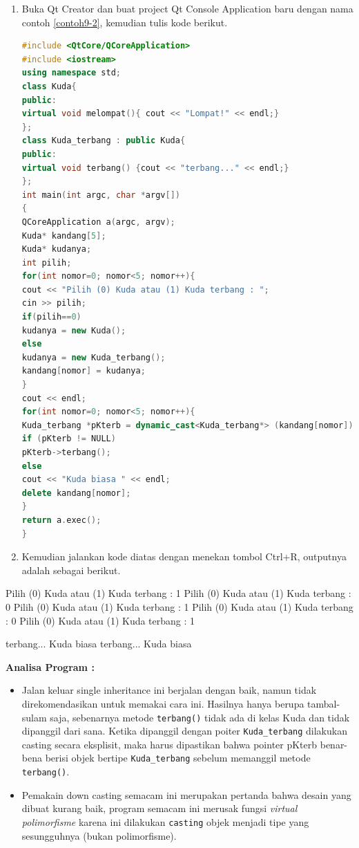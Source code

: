 \begin{enumerate}

\item
  Buka Qt Creator dan buat project Qt Console Application baru dengan
  nama contoh \ref{contoh9-2}, kemudian tulis kode berikut.

\begin{lstlisting}[language=c++, caption= Melakukan Down Casting, label=contoh9-2]
#include <QtCore/QCoreApplication>
#include <iostream>
using namespace std;
class Kuda{
public:
virtual void melompat(){ cout << "Lompat!" << endl;}
};
class Kuda_terbang : public Kuda{
public:
virtual void terbang() {cout << "terbang..." << endl;}
};
int main(int argc, char *argv[])
{
QCoreApplication a(argc, argv);
Kuda* kandang[5];
Kuda* kudanya;
int pilih;
for(int nomor=0; nomor<5; nomor++){
cout << "Pilih (0) Kuda atau (1) Kuda terbang : ";
cin >> pilih;
if(pilih==0)
kudanya = new Kuda();
else
kudanya = new Kuda_terbang();
kandang[nomor] = kudanya;
}
cout << endl;
for(int nomor=0; nomor<5; nomor++){
Kuda_terbang *pKterb = dynamic_cast<Kuda_terbang*> (kandang[nomor]);
if (pKterb != NULL)
pKterb->terbang();
else
cout << "Kuda biasa " << endl;
delete kandang[nomor];
}
return a.exec();
}
\end{lstlisting}
\item
  Kemudian jalankan kode diatas dengan menekan tombol Ctrl+R, outputnya
  adalah sebagai berikut.
\end{enumerate}

\begin{lcverbatim}
Pilih (0) Kuda atau (1) Kuda terbang : 1
Pilih (0) Kuda atau (1) Kuda terbang : 0
Pilih (0) Kuda atau (1) Kuda terbang : 1
Pilih (0) Kuda atau (1) Kuda terbang : 0
Pilih (0) Kuda atau (1) Kuda terbang : 1

terbang...
Kuda biasa
terbang...
Kuda biasa
\end{lcverbatim}

\textbf{Analisa Program :}

\begin{itemize}

\item
  Jalan keluar single inheritance ini berjalan dengan baik, namun tidak
  direkomendasikan untuk memakai cara ini. Hasilnya hanya berupa
  tambal-sulam saja, sebenarnya metode \texttt{terbang()} tidak ada di
  kelas Kuda dan tidak dipanggil dari sana. Ketika dipanggil dengan
  poiter \texttt{Kuda\_terbang} dilakukan casting secara eksplisit, maka
  harus dipastikan bahwa pointer pKterb benar-bena berisi objek bertipe
  \texttt{Kuda\_terbang} sebelum memanggil metode \texttt{terbang()}.
\item
  Pemakain down casting semacam ini merupakan pertanda bahwa desain yang
  dibuat kurang baik, program semacam ini merusak fungsi \emph{virtual
  polimorfisme} karena ini dilakukan \texttt{casting} objek menjadi tipe
  yang sesungguhnya (bukan polimorfisme).
\end{itemize}

